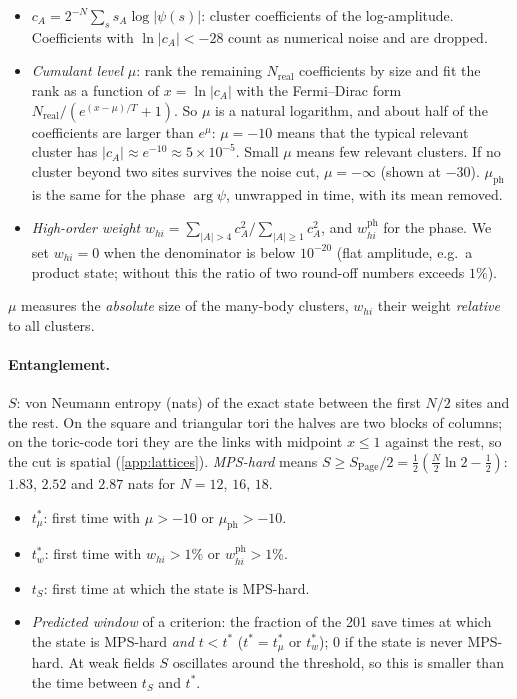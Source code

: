 \documentclass[11pt,a4paper]{article}
\newcommand{\tmu}{t^*_\mu}
\newcommand{\tw}{t^*_w}
\newcommand{\whi}{w_{hi}}
\newcommand{\Spage}{S_{\mathrm{Page}}}
\begin{document}
\begin{definition}[: cluster predictors $\mu$ and $\whi$]
\begin{itemize}
  \item $c_A=2^{-N}\sum_ss_A\log\lvert\psi(s)\rvert$: cluster coefficients of the log-amplitude. Coefficients with
    $\ln\lvert c_A\rvert<-28$ count as numerical noise and are dropped.
  \item \emph{Cumulant level} $\mu$: rank the remaining $N_{\mathrm{real}}$ coefficients by size and fit the rank as
    a function of $x=\ln\lvert c_A\rvert$ with the Fermi--Dirac form $N_{\mathrm{real}}/(e^{(x-\mu)/T}+1)$. So $\mu$
    is a natural logarithm, and about half of the coefficients are larger than $e^{\mu}$: $\mu=-10$ means that the
    typical relevant cluster has $\lvert c_A\rvert\approx e^{-10}\approx5\times10^{-5}$. Small $\mu$ means few
    relevant clusters. If no cluster beyond two sites survives the noise cut, $\mu=-\infty$ (shown at $-30$).
    $\mu_{\mathrm{ph}}$ is the same for the phase $\arg\psi$, unwrapped in time, with its mean removed.
  \item \emph{High-order weight} $\whi=\sum_{\lvert A\rvert>4}c_A^2/\sum_{\lvert A\rvert\ge1}c_A^2$, and
    $\whi^{\mathrm{ph}}$ for the phase. We set $\whi=0$ when the denominator is below $10^{-20}$ (flat amplitude, e.g.\
    a product state; without this the ratio of two round-off numbers exceeds $1\%$).
\end{itemize}
$\mu$ measures the \emph{absolute} size of the many-body clusters, $\whi$ their weight \emph{relative} to all clusters.
\end{definition}

\paragraph{Entanglement.} $S$: von Neumann entropy (nats) of the exact state between the first $N/2$ sites and the
rest. On the square and triangular tori the halves are two blocks of columns; on the toric-code tori they are the links
with midpoint $x\le1$ against the rest, so the cut is spatial (\cref{app:lattices}). \emph{MPS-hard} means
$S\ge\Spage/2=\tfrac12(\tfrac N2\ln2-\tfrac12)$: $1.83$, $2.52$ and $2.87$ nats for $N=12$, $16$, $18$.

\begin{definition}
\begin{itemize}
  \item $\tmu$: first time with $\mu>-10$ or $\mu_{\mathrm{ph}}>-10$.
  \item $\tw$: first time with $\whi>1\%$ or $\whi^{\mathrm{ph}}>1\%$.
  \item $t_S$: first time at which the state is MPS-hard.
  \item \emph{Predicted window} of a criterion: the fraction of the 201 save times at which the state is MPS-hard
    \emph{and} $t<t^*$ ($t^*=\tmu$ or $\tw$); $0$ if the state is never MPS-hard. At weak fields $S$ oscillates
    around the threshold, so this is smaller than the time between $t_S$ and $t^*$.
\end{itemize}
\end{definition}
\end{document}
